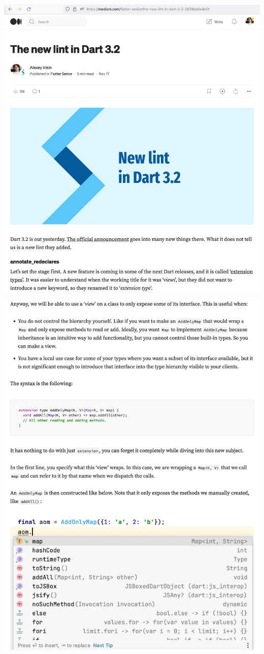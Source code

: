 
\begin{center}
    \includegraphics[width=38em]{new-lint-dart-32-p1}
\end{center}
\WillContinue
\pagebreak

\Continuing
\begin{center}
    \includegraphics[width=38em]{new-lint-dart-32-p2}
\end{center}

\pagebreak
